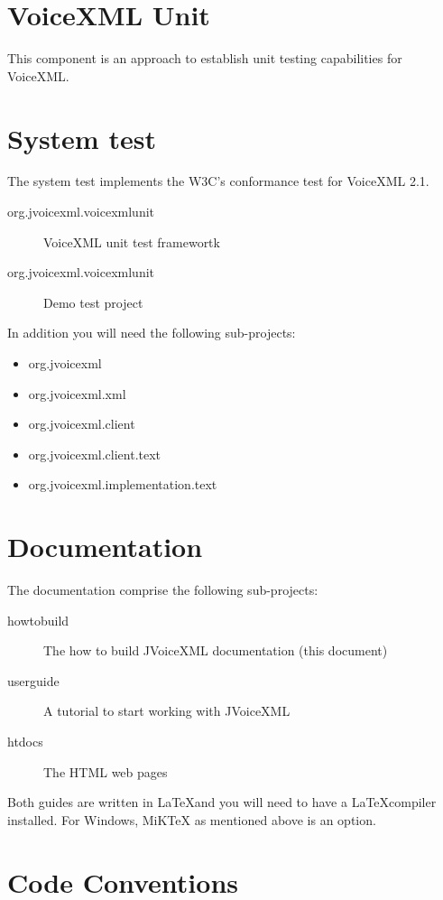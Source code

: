 \documentclass[11pt,a4paper]{article}
\begin{document}
\section{VoiceXML Unit}
\label{voicexml-unit}

This component is an approach to establish unit testing capabilities for
VoiceXML.

\section{System test}

The system test implements the W3C's conformance test for VoiceXML 2.1.

\begin{description}
\item[org.jvoicexml.voicexmlunit] VoiceXML unit test framewortk
\item[org.jvoicexml.voicexmlunit] Demo test project
\end{description}

In addition you will need the following sub-projects:
\begin{itemize}
\item org.jvoicexml
\item org.jvoicexml.xml
\item org.jvoicexml.client
\item org.jvoicexml.client.text
\item org.jvoicexml.implementation.text
\end{itemize} 

\section{Documentation}

The documentation comprise the following sub-projects:

\begin{description}
\item[howtobuild] The how to build JVoiceXML documentation (this document)
\item[userguide] A tutorial to start working with JVoiceXML
\item[htdocs] The HTML web pages
\end{description}

Both guides are written in \LaTeX and you will need to have a \LaTeX compiler
installed. For Windows, MiKTeX as mentioned above is an option.


\section{Code Conventions}
\label{sec:code-conventions}
\end{document}
